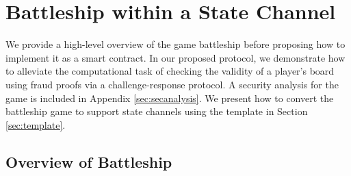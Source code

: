 \documentclass{llncs}
\newcommand{\hcell}{\mathsf{hcell}}
\newcommand{\hship}{\mathsf{hship}}
\begin{document}
\section{Battleship within a State Channel} 

We provide a high-level overview of the game battleship before proposing how to implement it as a smart contract.  
In our proposed protocol, we demonstrate how to alleviate the computational task of checking the validity of a player's board using fraud proofs via a challenge-response protocol.
A security analysis for the game is included in Appendix \ref{sec:secanalysis}.
We present how to convert the battleship game to support state channels using the template in Section \ref{sec:template}. 

\subsection{Overview of Battleship}
\end{document}
